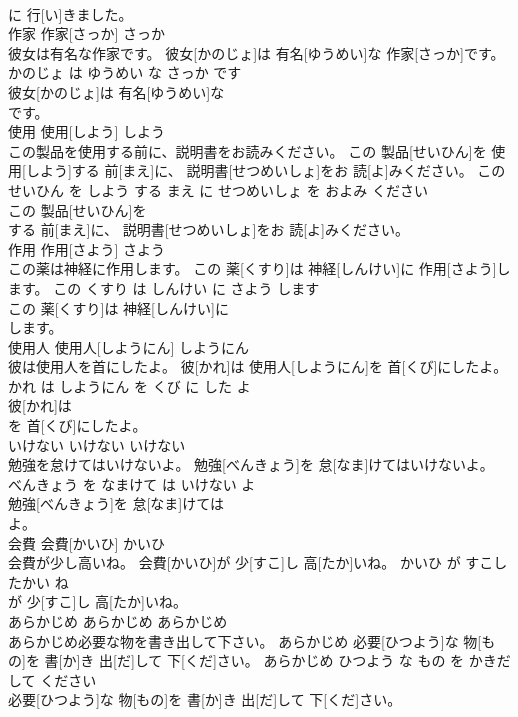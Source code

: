 \documentclass[8pt]{extreport}
\begin{document}
\begin{CJK}{UTF8}{min}
\\	に 行[い]きました。			
\\	作家	作家[さっか]	さっか	
\\	彼女は有名な作家です。	彼女[かのじょ]は 有名[ゆうめい]な 作家[さっか]です。	かのじょ は ゆうめい な さっか です	
\\	彼女[かのじょ]は 有名[ゆうめい]な
\\	です。			
\\	使用	使用[しよう]	しよう	
\\	この製品を使用する前に、説明書をお読みください。	この 製品[せいひん]を 使用[しよう]する 前[まえ]に、 説明書[せつめいしょ]をお 読[よ]みください。	この せいひん を しよう する まえ に せつめいしょ を およみ ください	
\\	この 製品[せいひん]を
\\	する 前[まえ]に、 説明書[せつめいしょ]をお 読[よ]みください。			
\\	作用	作用[さよう]	さよう	
\\	この薬は神経に作用します。	この 薬[くすり]は 神経[しんけい]に 作用[さよう]します。	この くすり は しんけい に さよう します	
\\	この 薬[くすり]は 神経[しんけい]に
\\	します。			
\\	使用人	使用人[しようにん]	しようにん	
\\	彼は使用人を首にしたよ。	彼[かれ]は 使用人[しようにん]を 首[くび]にしたよ。	かれ は しようにん を くび に した よ	
\\	彼[かれ]は
\\	を 首[くび]にしたよ。			
\\	いけない	いけない	いけない	
\\	勉強を怠けてはいけないよ。	勉強[べんきょう]を 怠[なま]けてはいけないよ。	べんきょう を なまけて は いけない よ	
\\	勉強[べんきょう]を 怠[なま]けては
\\	よ。			
\\	会費	会費[かいひ]	かいひ	
\\	会費が少し高いね。	会費[かいひ]が 少[すこ]し 高[たか]いね。	かいひ が すこし たかい ね	
\\	が 少[すこ]し 高[たか]いね。			
\\	あらかじめ	あらかじめ	あらかじめ	
\\	あらかじめ必要な物を書き出して下さい。	あらかじめ 必要[ひつよう]な 物[もの]を 書[か]き 出[だ]して 下[くだ]さい。	あらかじめ ひつよう な もの を かきだして ください	
\\	必要[ひつよう]な 物[もの]を 書[か]き 出[だ]して 下[くだ]さい。			

\end{CJK}
\end{document}
